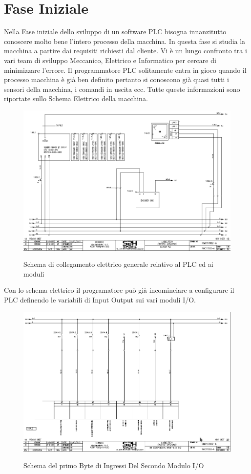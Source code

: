 \documentclass[12pt, a4paper, oneside]{book}
\begin{document}
\section{Fase Iniziale }
Nella Fase iniziale dello sviluppo di un software PLC bisogna innanzitutto conoscere molto bene l'intero processo della macchina. In questa fase si studia la macchina a partire dai requisiti richiesti dal cliente. Vi è un lungo confronto tra i vari team di sviluppo Meccanico, Elettrico e Informatico per cercare di minimizzare l'errore. Il programmatore PLC solitamente entra in gioco quando il processo macchina è già ben definito pertanto si conoscono già quasi tutti i sensori della macchina, i comandi in uscita ecc. 
Tutte queste informazioni sono riportate sullo Schema Elettrico della macchina.

\begin{figure}[H]
	\centering
	\includegraphics[width=12cm]{Immagini/SCELE1}
	\label{scele1}
	\caption{Schema di collegamento elettrico generale relativo al PLC ed ai moduli }
\end{figure}


Con lo schema elettrico il programatore può già incominciare a configurare il PLC definendo le variabili di Input Output sui vari moduli I/O. 

\begin{figure}[H]
	\centering
	\includegraphics[width=12cm]{Immagini/SCELE2}
	\label{scele2}
	\caption{Schema del primo Byte di Ingressi Del Secondo Modulo I/O}
\end{figure}
\end{document}
